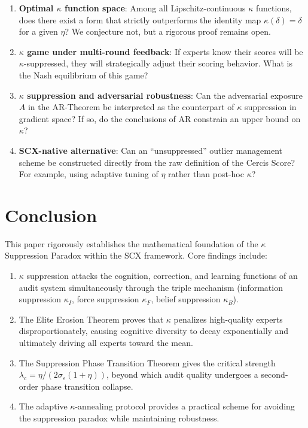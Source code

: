 \documentclass[12pt,a4paper]{article}
\theoremstyle{definition}
\begin{document}
\begin{enumerate}[label=\textbf{OP\arabic*}, leftmargin=*]
    \item \textbf{Optimal $\kappa$ function space}: Among all Lipschitz-continuous $\kappa$ functions, does there exist a form that strictly outperforms the identity map $\kappa(\delta)=\delta$ for a given $\eta$? We conjecture not, but a rigorous proof remains open.
    \item \textbf{$\kappa$ game under multi-round feedback}: If experts know their scores will be $\kappa$-suppressed, they will strategically adjust their scoring behavior. What is the Nash equilibrium of this game?
    \item \textbf{$\kappa$ suppression and adversarial robustness}: Can the adversarial exposure $A$ in the AR-Theorem be interpreted as the counterpart of $\kappa$ suppression in gradient space? If so, do the conclusions of AR constrain an upper bound on $\kappa$?
    \item \textbf{SCX-native alternative}: Can an ``unsuppressed'' outlier management scheme be constructed directly from the raw definition of the Cercis Score? For example, using adaptive tuning of $\eta$ rather than post-hoc $\kappa$?
\end{enumerate}

\section{Conclusion}
\label{sec:conclusion}

This paper rigorously establishes the mathematical foundation of the $\kappa$ Suppression Paradox within the SCX framework. Core findings include:

\begin{enumerate}[label=(\arabic*)]
    \item $\kappa$ suppression attacks the cognition, correction, and learning functions of an audit system simultaneously through the triple mechanism (information suppression $\kappa_I$, force suppression $\kappa_F$, belief suppression $\kappa_B$).
    \item The Elite Erosion Theorem proves that $\kappa$ penalizes high-quality experts disproportionately, causing cognitive diversity to decay exponentially and ultimately driving all experts toward the mean.
    \item The Suppression Phase Transition Theorem gives the critical strength $\lambda_c = \eta/(2\sigma_\varepsilon(1+\eta))$, beyond which audit quality undergoes a second-order phase transition collapse.
    \item The adaptive $\kappa$-annealing protocol provides a practical scheme for avoiding the suppression paradox while maintaining robustness.
\end{enumerate}
\end{document}
